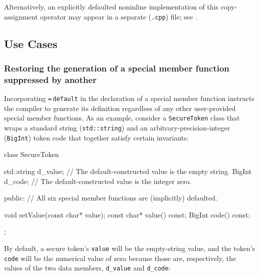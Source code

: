 \noindent Alternatively, an explicitly defaulted noninline implementation of this
copy-assignment operator may appear in a separate (\lstinline!.cpp!) file;
see .

\subsection[Use Cases]{Use Cases}\label{default-use-cases}

\subsubsection[Restoring the generation of a special member function suppressed by another]{Restoring the generation of a special member function suppressed by another}\label{restoring-the-generation-of-a-special-member-function-suppressed-by-another}

Incorporating \lstinline!=!\,\lstinline!default! in the declaration of a
special member function instructs the compiler to generate its
definition regardless of any other user-provided special member
functions. As an example, consider a 
\lstinline!SecureToken! class that wraps a standard string
(\lstinline!std::string!) and an arbitrary-precision-integer
(\lstinline!BigInt!) token code that together satisfy certain invariants:

\begin{emcppslisting}[language=C++]
class SecureToken
{
    std::string d_value;  // The default-constructed value is the empty string.
    BigInt      d_code;   // The default-constructed value is the integer zero.

public:
    // All six special member functions are (implicitly) defaulted.

    void setValue(const char* value);
    const char* value() const;
    BigInt code() const;
};
\end{emcppslisting}

\noindent By default, a secure token's \lstinline!value! will be the empty-string
value, and the token's \lstinline!code! will be the numerical value of zero
because those are, respectively, the  values
of the two data members, \lstinline!d_value! and \lstinline!d_code!:

